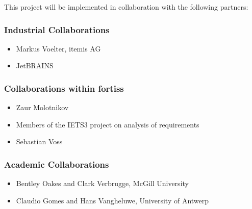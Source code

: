 This project will be implemented in collaboration with the following partners:

\subsubsection{Industrial Collaborations}
\begin{itemize}
  \item Markus Voelter, itemis AG
  \item JetBRAINS
\end{itemize}

\subsubsection{Collaborations within fortiss}
\begin{itemize}
  \item Zaur Molotnikov
  \item Members of the IETS3 project on analysis of requirements
  \item Sebastian Voss
\end{itemize}

\subsubsection{Academic Collaborations}
\begin{itemize}
  \item Bentley Oakes and Clark Verbrugge, McGill University
  \item Claudio Gomes and Hans Vangheluwe, University of Antwerp
\end{itemize}
